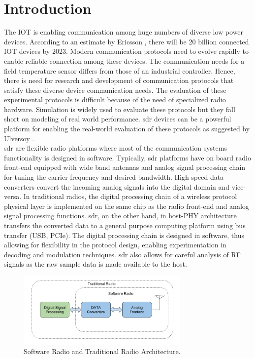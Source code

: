 \chapter{Introduction}
The \ac{IOT} is enabling communication among huge numbers of diverse low power devices.  
According to an estimate by Ericsson \cite{noauthor_internet_2017}, there will be 20 billion connected \ac{IOT} devices by 2023.
Modern communication protocols need to evolve rapidly to enable reliable connection among these devices.
The communication needs for a field temperature sensor differs from those of an industrial controller. 
Hence, there is need for research and development of communication protocols that satisfy these diverse device communication needs. 
The evaluation of these experimental protocols is difficult because of the need of specialized radio hardware.
Simulation is widely used to evaluate these protocols but they fall short on modeling of real world performance.
\ac{sdr} devices can be a powerful platform for enabling the real-world evaluation of these protocols as suggested by Ulversoy \cite{ulversoy2010software}.\\

\ac{sdr} are flexible radio platforms where most of the communication systems functionality is designed in software. Typically, \ac{sdr} platforms have on board radio front-end equipped with wide band antennas and analog signal processing chain for tuning the carrier frequency and desired bandwidth. High speed data converters convert the incoming analog signals into the digital domain and vice-versa. In traditional radios, the digital processing chain of a wireless protocol physical layer is implemented on the same chip as the radio front-end and analog signal processing functions. \ac{sdr}, on the other hand, in host-PHY \cite{nychis_enabling_nodate} architecture transfers the converted data to a general purpose computing platform using bus transfer (USB, PCIe).  The digital processing chain is designed in software, thus allowing for flexibility in the protocol design, enabling experimentation in decoding and modulation techniques. \ac{sdr} also allows for careful analysis of RF signals as the raw sample data is made available to the host.\\

\begin{figure}[!h]
\centering
\includegraphics[width=0.75\textwidth]{Figure/SDRSystem.png}
\caption{Software Radio and Traditional Radio Architecture.}
\label{sdr_architecture}
\end{figure}


